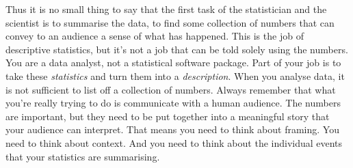 Thus it is no small thing to say that the first task of the statistician and the scientist is to summarise the data, to find some collection of numbers that can convey to an audience a sense of what has happened. This is the job of descriptive statistics, but it's not a job that can be told solely using the numbers. You are a data analyst, not a statistical software package. Part of your job is to take these {\it statistics} and turn them into a {\it description}. When you analyse data, it is not sufficient to list off a collection of numbers. Always remember that what you're really trying to do is communicate with a human audience. The numbers are important, but they need to be put together into a meaningful story that your audience can interpret. That means you need to think about framing. You need to think about context. And you need to think about the individual events that your statistics are summarising. 

